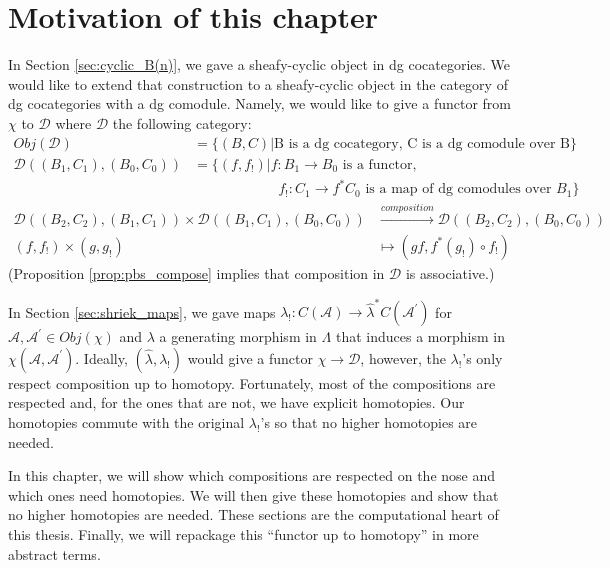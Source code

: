\section{Motivation of this chapter}
In Section \ref{sec:cyclic_B(n)}, we gave a 
sheafy-cyclic object in dg cocategories. 
We would like to extend that construction 
to a sheafy-cyclic object in the 
category of dg cocategories with a dg 
comodule. Namely, we would like to give 
a functor from $\chi$ to $\mathcal{D}$ 
where $\mathcal{D}$ the following 
category:
\begin{align*}
Obj(\mathcal{D}) 
&= 
\{(B,C) |
  \textrm{B is a dg cocategory, 
  C is a dg comodule over B}\} \\
\mathcal{D}((B_1, C_1), (B_0, C_0))  
&= 
\{(f, f_!) | f:B_1 \to B_0 
  \textrm{ is a functor,}\\
& \phantom{{}=[(f, f_!)]{}}  
  f_!:C_1 \to f^*C_0 
  \textrm{ is a map of dg comodules over }
  B_1\}
\end{align*}
\begin{align*}  
\mathcal{D}((B_2, C_2), (B_1, C_1)) \times  
\mathcal{D}((B_1, C_1), (B_0, C_0))
&\xrightarrow{composition}
\mathcal{D}((B_2, C_2), (B_0, C_0))\\
(f,f_!) \times (g, g_!)
&\mapsto
(gf, f^*(g_!)\circ f_!)
\end{align*}
(Proposition \ref{prop:pbs_compose} implies 
that composition in $\mathcal{D}$ is 
associative.)

In Section \ref{sec:shriek_maps}, we 
gave maps $\lambda_!: C(\mathcal{A}) 
\to \hat{\lambda}^*C(\mathcal{A}^\prime)$ 
for $\mathcal{A}, \mathcal{A}^\prime \in 
Obj(\chi)$ and $\lambda$ a generating 
morphism in $\Lambda$ that induces a 
morphism in $\chi(\mathcal{A}, 
\mathcal{A}^\prime)$. Ideally,  
$(\hat{\lambda}, \lambda_!)$ would give a functor 
$\chi \to \mathcal{D}$, however, 
the $\lambda_!$'s only respect 
composition up to homotopy. Fortunately, 
most of the compositions are respected 
and, for the ones that are not, we 
have explicit homotopies. Our homotopies 
commute with the original 
$\lambda_!$'s so that no higher homotopies 
are needed.

In this chapter, we will show which compositions 
are respected on the nose and which ones 
need homotopies. We will then give these homotopies 
and show that no higher homotopies are 
needed. These sections are the computational 
heart of this thesis. Finally, we will 
repackage this ``functor up to homotopy'' 
in more abstract terms.